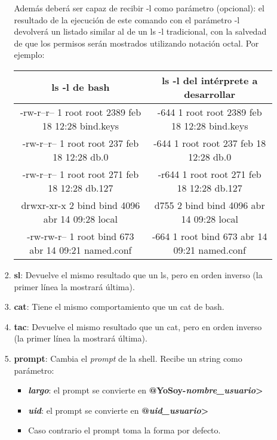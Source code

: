 \begin{enumerate}
\begin{enumerate}
\begin{enumerate}
	     Además deberá ser capaz de recibir -l como parámetro (opcional):  el resultado de la ejecución de este comando con el parámetro -l devolverá un listado similar al de un ls -l tradicional, con la salvedad de que los permisos serán mostrados utilizando notación octal. Por ejemplo:
	     \begin{table}[th]
		    \centering
		    \begin{tabular}{| c | c |}
			    \hline
			    \bf ls -l de bash & \bf ls -l del intérprete a desarrollar \\
			    \hline
			    -rw-r--r-- 1 root root 2389 feb 18 12:28 bind.keys & -644 1 root root 2389 feb 18 12:28 bind.keys \\ 
			    \hline
			    -rw-r--r-- 1 root root 237 feb 18 12:28 db.0 & -644 1 root root 237 feb 18 12:28 db.0 \\
			    \hline
			    -rw-r--r-- 1 root root 271 feb 18 12:28 db.127 & -r644 1 root root 271 feb 18 12:28 db.127 \\
			    \hline
			    drwxr-xr-x 2 bind bind 4096 abr 14 09:28 local & d755 2 bind bind 4096 abr 14 09:28 local \\
			    \hline
			    -rw-rw-r-- 1 root bind 673 abr 14 09:21 named.conf & -664 1 root bind 673 abr 14 09:21 named.conf \\
			    \hline
		    \end{tabular}
	     \end{table}
	     
	     \item \textbf{sl}: Devuelve el mismo resultado que un ls, pero en orden inverso (la primer línea la mostrará última).

	     \item \textbf{cat}: Tiene el mismo comportamiento que un cat de bash.

	     \item \textbf{tac}: Devuelve el mismo resultado que un cat, pero en orden inverso (la primer línea la mostrará última).

		 \item \textbf{prompt}: Cambia el \textit{prompt} de la shell. Recibe un string como parámetro:
		 \begin{itemize}
		 	\item \textbf{\emph{largo}}: el prompt se convierte en \textbf{@YoSoy-\emph{nombre\_usuario}>}
		 	\item \textbf{\emph{uid}}: el prompt se convierte en \textbf{@\emph{uid\_usuario}>}
		 	\item Caso contrario el prompt toma la forma por defecto.
		 \end{itemize}
	     

\end{enumerate}
\end{enumerate}
\end{enumerate}

